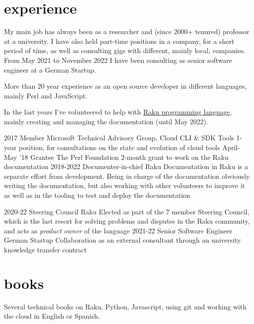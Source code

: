 \documentclass[]{friggeri-jj-cv}
\begin{document}
\section{experience}

My main job has always been as a researcher and (since 2000+ tenured) professor
at a university. I have also held part-time positions in a company, for a short
period of time, as well as consulting gigs with different, mainly local,
companies. From May 2021 to November 2022 I have been consulting as senior
software engineer at a German Startup.

More than 20 year experience as an open source developer in different languages,
mainly Perl and JavaScript.

In the last years I've volunteered to
help with \href{https://raku.org}{Raku programming language}, mainly creating
and managing the documentation (until May 2022).

\begin{entrylist}
    \entry
    {2017}
    {Member}
    {Microsoft Technical Advisory Group, Cloud CLI \& SDK Tools}
    {1-year position, for consultations on the state and evolution of
      cloud tools}
    \entry
    {April-May '18}
    {Grantee}
    {The Perl Foundation}
    {2-month grant to work on the Raku documentation}
    \entry
    {2018-2022}
    {Documenter-in-chief}
    {Raku}
    {Documentation in Raku is a separate effort from
      development. Being in charge of the documentation obviously
      writing the documentation, but also working with other
      volunteers to improve it as well as in the tooling to test and
      deploy the documentation}

        \entry
    {2020-22}
    {Steering Council}
    {Raku}
    {Elected as part of the 7 member Steering Council, which is the
      last resort for solving problems and disputes in the Raku
      community, and acts as {\em product owner} of the language}
    \entry
    {2021-22}
    {Senior Software Engineer}
    {German Startup}
    {Collaboration as an external consultant through an university
      knowledge transfer contract}

\end{entrylist}

\section{books}

Several technical books on Raku, Python, Javascript, using git and working with
the cloud in English or Spanish.
\end{document}
